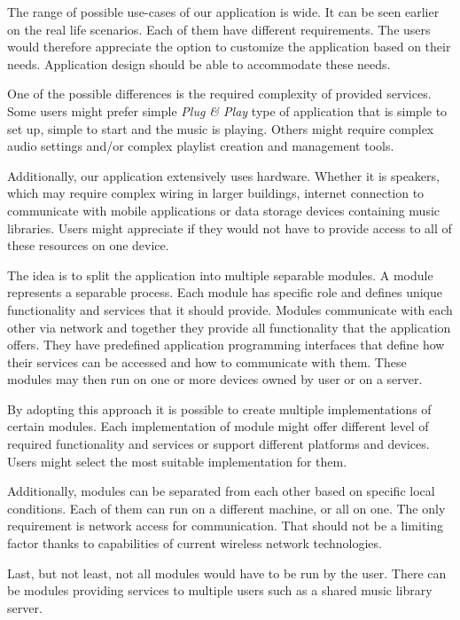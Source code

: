 The range of possible use-cases of our application is wide. It can be seen earlier on the real life scenarios. Each of them have different requirements. The users would therefore appreciate the option to customize the application based on their needs. Application design should be able to accommodate these needs.
\par
One of the possible differences is the required complexity of provided services. Some users might prefer simple \textit{Plug \& Play} type of application that is simple to set up, simple to start and the music is playing. Others might require complex audio settings and/or complex playlist creation and management tools.
\par
Additionally, our application extensively uses hardware. Whether it is speakers, which may require complex wiring in larger buildings, internet connection to communicate with mobile applications or data storage devices containing music libraries. Users might appreciate if they would not have to provide access to all of these resources on one device.
\par
The idea is to split the application into multiple separable modules. A module represents a separable process. Each module has specific role and defines unique functionality and services that it should provide. Modules communicate with each other via network and together they provide all functionality that the application offers. They have predefined application programming interfaces that define how their services can be accessed and how to communicate with them. These modules may then run on one or more devices owned by user or on a server.
\par
By adopting this approach it is possible to create multiple implementations of certain modules. Each implementation of module might offer different level of required functionality and services or support different platforms and devices. Users might select the most suitable implementation for them.
\par 
Additionally, modules can be separated from each other based on specific local conditions. Each of them can run on a different machine, or all on one. The only requirement is network access for communication. That should not be a limiting factor thanks to capabilities of current wireless network technologies.
\par 
Last, but not least, not all modules would have to be run by the user. There can be modules providing services to multiple users such as a shared music library server.

